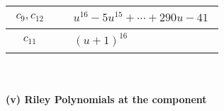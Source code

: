 \documentclass[1p]{elsarticle_modified}
\theoremstyle{definition}
\begin{document}
\begin{tabular}{m{50pt}|m{274pt}}
\hline $$\begin{aligned}c_{9},c_{12}\end{aligned}$$&$\begin{aligned}
&u^{16}-5 u^{15}+\cdots+290 u-41
\end{aligned}$\\
\hline $$\begin{aligned}c_{11}\end{aligned}$$&$\begin{aligned}
&(u+1)^{16}
\end{aligned}$\\
\hline
\end{tabular}\\~\\
\newpage\renewcommand{\arraystretch}{1}
\flushleft \textbf{(v) Riley Polynomials at the component}\newline \\
\end{document}
